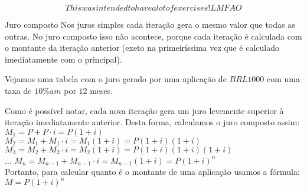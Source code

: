 \documentclass{book}
\theoremstyle{definition}
\theoremstyle{remark}
\theoremstyle{plain}
\theoremstyle{plain}
\theoremstyle{plain}
\begin{document}
    $$This was intended to have a lot of exercises! LMFAO $$


    Juro composto
    Nos juros simples cada iteração gera o mesmo valor que todas as outras. 
    No juro composto isso não acontece, porque cada iteração é calculada com o montante da iteração anterior 
    (exeto na primeiríssima vez que é calculado imediatamente com o principal).
    \begin{example}
        Vejamos uma tabela com o juro gerado por uma aplicação de $BRL 1000$ com uma taxa de $10\%am$ por $12$ meses.
    \end{example}
    Como é possível notar, cada nova iteração gera um juro levemente superior à iteração imediatamente anterior.
    Desta forma, calculamos o juro composto assim:
    $M_1 = P + P \cdot i = P(1 + i)$ \\
    $M_2 = M_1 + M_1 \cdot i = M_1 (1 + i) = P(1+i)(1+i)$ \\
    $M_3 = M_2 + M_2 \cdot i = M_2 (1 + i) = P(1+i)(1+i)(1+i)$ \\
    ...
    $M_n = M_{n-1} + M_{n-1} \cdot i = M_{n-1}(1 + i) = P(1+i)^n$ \\
    Portanto, para calcular quanto é o montante de uma aplicação usamos a fórmula: $M = P (1+i)^n$
    
\end{document}
